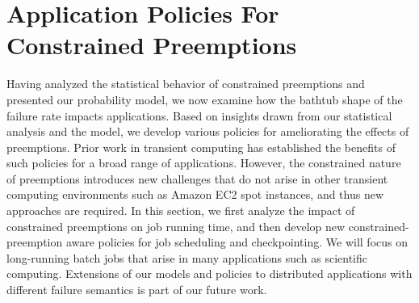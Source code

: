 \vspace*{\subsecspace}
\section{Application Policies For Constrained Preemptions}
\label{sec:policies}
Having analyzed the statistical behavior of constrained preemptions and presented our probability model, we now examine how the bathtub shape of the failure rate impacts applications. 
Based on insights drawn from our statistical analysis and the model, we develop various policies for ameliorating the effects of preemptions. 
Prior work in transient computing has established the benefits of such policies for a broad range of applications. 
However, the constrained nature of preemptions introduces new challenges that do not arise in other transient computing environments such as Amazon EC2 spot instances, and thus new approaches are required. 
In this section, we first analyze the impact of constrained preemptions on job running time, and then develop new constrained-preemption aware policies for job scheduling and checkpointing. 
We will focus on long-running batch jobs that arise in many applications such as scientific computing. Extensions of our models and policies to distributed applications with different failure semantics is part of our future work.







